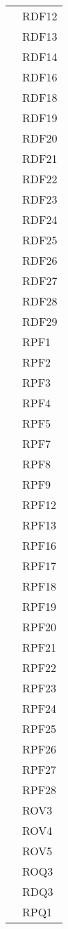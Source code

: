 \begin{longtable}{| p{5cm} | p{5cm} |}
				&	RDF12 \\
				&	RDF13 \\
				&	RDF14 \\
				&	RDF16 \\
				&	RDF18 \\
				&	RDF19 \\
				&	RDF20 \\
				&	RDF21 \\
				&	RDF22 \\
				&	RDF23 \\
				&	RDF24 \\
				&	RDF25 \\
				&	RDF26 \\
				&	RDF27 \\
				&	RDF28 \\
				&	RDF29 \\
				&	RPF1 \\
				&	RPF2 \\
				&	RPF3 \\
				&	RPF4 \\
				&	RPF5 \\
				&	RPF7 \\
				&	RPF8 \\
				&	RPF9 \\
				&	RPF12 \\
				&	RPF13 \\
				&	RPF16 \\
				&	RPF17 \\
				&	RPF18 \\
				&	RPF19 \\
				&	RPF20 \\
				&	RPF21 \\
				&	RPF22 \\
				&	RPF23 \\
				&	RPF24 \\
				&	RPF25\\
				&	RPF26 \\
				&	RPF27 \\
				& 	RPF28 \\
				&	ROV3 \\
				&	ROV4 \\
				&	ROV5 \\
				&	ROQ3 \\
				&	RDQ3 \\
				&	RPQ1 \\
				 \hline
					

\end{longtable}

